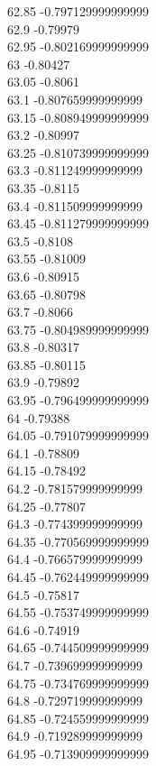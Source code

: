 {62.85	-0.797129999999999\\
62.9	-0.79979\\
62.95	-0.802169999999999\\
63	-0.80427\\
63.05	-0.8061\\
63.1	-0.807659999999999\\
63.15	-0.808949999999999\\
63.2	-0.80997\\
63.25	-0.810739999999999\\
63.3	-0.811249999999999\\
63.35	-0.8115\\
63.4	-0.811509999999999\\
63.45	-0.811279999999999\\
63.5	-0.8108\\
63.55	-0.81009\\
63.6	-0.80915\\
63.65	-0.80798\\
63.7	-0.8066\\
63.75	-0.804989999999999\\
63.8	-0.80317\\
63.85	-0.80115\\
63.9	-0.79892\\
63.95	-0.796499999999999\\
64	-0.79388\\
64.05	-0.791079999999999\\
64.1	-0.78809\\
64.15	-0.78492\\
64.2	-0.781579999999999\\
64.25	-0.77807\\
64.3	-0.774399999999999\\
64.35	-0.770569999999999\\
64.4	-0.766579999999999\\
64.45	-0.762449999999999\\
64.5	-0.75817\\
64.55	-0.753749999999999\\
64.6	-0.74919\\
64.65	-0.744509999999999\\
64.7	-0.739699999999999\\
64.75	-0.734769999999999\\
64.8	-0.729719999999999\\
64.85	-0.724559999999999\\
64.9	-0.719289999999999\\
64.95	-0.713909999999999\\
}
